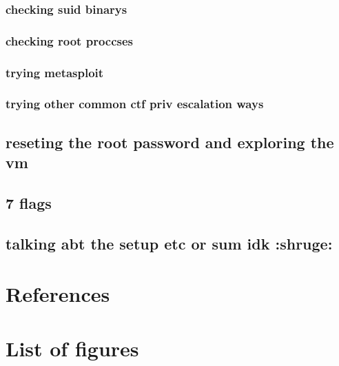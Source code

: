 \documentclass[a4paper]{article}
\begin{document}
\subsubsection{checking suid binarys}
\subsubsection{checking root proccses}
\subsubsection{trying metasploit}
\subsubsection{trying other common ctf priv escalation ways}
\subsection{reseting the root password and exploring the vm}
\subsection{7 flags}
\subsection{talking abt the setup etc or sum idk :shruge:}

\newpage
\section{References}

\newpage
\section{List of figures}

\listoffigures
\end{document}
